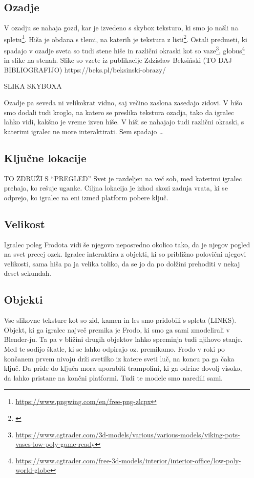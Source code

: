 \documentclass[a4paper,12pt]{article}
\begin{document}
\subsection{Ozadje}
\noindent  V ozadju se nahaja gozd, kar je izvedeno s skybox teksturo, ki smo jo našli na spletu\footnote{\url{https://www.pngwing.com/en/free-png-zlcpx}}. Hiša je obdana s tlemi, na katerih je tekstura z listi\footnote{\url{}}. Ostali predmeti, ki spadajo v ozadje sveta so tudi stene hiše in različni okraski kot so vaze\footnote{\url{https://www.cgtrader.com/3d-models/various/various-models/viking-pots-vases-low-poly-game-ready}}, globus\footnote{\url{https://www.cgtrader.com/free-3d-models/interior/interior-office/low-poly-world-globe}} in slike na stenah. Slike so vzete iz publikacije Zdzisław Beksiński (TO DAJ BIBLIOGRAFIJO) https://beks.pl/beksinski-obrazy/

SLIKA SKYBOXA

Ozadje pa seveda ni velikokrat vidno, saj večino zaslona zasedajo zidovi. V hišo smo dodali tudi kroglo, na katero se preslika tekstura ozadja, tako da igralec lahko vidi, kakšno je vreme izven hiše. V hiši se nahajajo tudi različni okraski, s katerimi igralec ne more interaktirati. Sem spadajo …

\begin{figure}[h!]
    \centering
\end{figure}

\subsection{Ključne lokacije}
TO ZDRUŽI S “PREGLED”
\noindent Svet je razdeljen na več sob, med katerimi igralec prehaja, ko rešuje uganke. Ciljna lokacija je izhod skozi zadnja vrata, ki se odprejo, ko igralec na eni izmed platform pobere ključ.


\subsection{Velikost}
\noindent Igralec poleg Frodota vidi še njegovo neposredno okolico tako, da je njegov pogled na svet precej ozek. Igralec interaktira z objekti, ki so približno polovični njegovi velikosti, sama hiša pa ja velika toliko, da se jo da po dolžini prehoditi v nekaj deset sekundah.

\subsection{Objekti}
\noindent Vse slikovne teksture kot so zid, kamen in les smo pridobili s spleta (LINKS). Objekt, ki ga igralec največ premika je Frodo, ki smo ga sami zmodelirali v Blender-ju. Ta pa v bližini drugih objektov lahko spreminja tudi njihovo stanje. Med te sodijo škatle, ki se lahko odpirajo oz. premikamo. Frodo v roki po končanem prvem nivoju drži svetilko iz katere sveti luč, na koncu pa ga čaka ključ. Da pride do ključa mora uporabiti trampolini, ki ga odrine dovolj visoko, da lahko pristane na končni platformi. Tudi te modele smo naredili sami.
\end{document}
